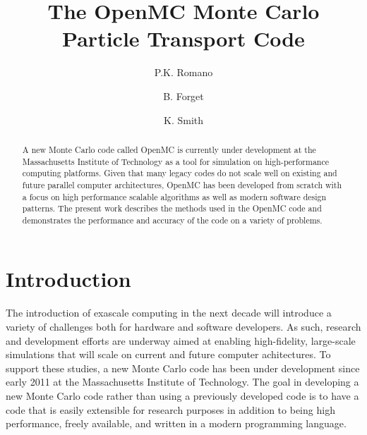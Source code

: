 \documentclass{elsarticle}
\begin{document}
\title{The OpenMC Monte Carlo Particle Transport Code}
\author[mit]{P.K. Romano}

\author[mit]{B. Forget}

\author[mit]{K. Smith}

\address[mit]{Massachusetts Institute of Technology, Department of Nuclear
  Science and Engineering, 77 Massachusetts Avenue, Building 24-213, Cambridge,
  MA 02141}

\begin{abstract}
A new Monte Carlo code called OpenMC is currently under development at the
Massachusetts Institute of Technology as a tool for simulation on
high-performance computing platforms. Given that many legacy codes do not scale
well on existing and future parallel computer architectures, OpenMC has been
developed from scratch with a focus on high performance scalable algorithms as
well as modern software design patterns. The present work describes the methods
used in the OpenMC code and demonstrates the performance and accuracy of the
code on a variety of problems.
\end{abstract}

\maketitle

\section{Introduction}

The introduction of exascale computing in the next decade will introduce a
variety of challenges both for hardware and software developers. As such,
research and development efforts are underway aimed at enabling high-fidelity,
large-scale simulations that will scale on current and future computer
achitectures. To support these studies, a new Monte Carlo code has been under
development since early 2011 at the Massachusetts Institute of Technology. The
goal in developing a new Monte Carlo code rather than using a previously
developed code is to have a code that is easily extensible for research purposes
in addition to being high performance, freely available, and written in a modern
programming language.
\end{document}
